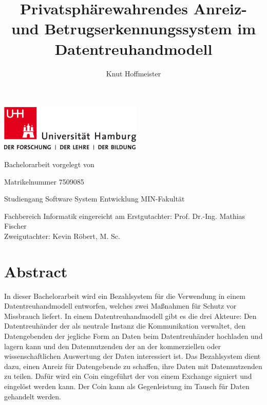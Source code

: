 \documentclass[
	fontsize=11pt,
	headings=small,
	parskip=half,           %
	bibliography=totoc,
	numbers=noenddot,       %
	open=any,               %
]{scrreprt}
\begin{document}
\title{Privatsphärewahrendes Anreiz- und Betrugserkennungssystem im\\ Datentreuhandmodell}
\author{Knut Hoffmeister}

\begin{titlepage}
\includegraphics[width=6.8cm]{up-uhh-logo-u-2010-u-farbe-u-rgb.pdf}
\begin{center}
    \vfill
    \Large Bachelorarbeit
    \vfill
    \makeatletter
    {\Large\textsf{\textbf{\@title}}}
    \makeatother
    \vfill
    vorgelegt von
    \par\bigskip
    \makeatletter
    {\@author}
    \makeatother
    \par
    Matrikelnummer 7509085 \par
    Studiengang Software System Entwicklung
    \vfill
    MIN-Fakultät \par
    Fachbereich Informatik
    \vfill
    \makeatletter
    eingereicht am {\@date}
    \makeatother
    \vfill
    Erstgutachter: Prof. Dr.-Ing. Mathias Fischer\\
    Zweigutachter: Kevin Röbert, M. Sc.
\end{center}
\end{titlepage}

\restoregeometry

\tableofcontents

\chapter*{Abstract}
In dieser Bachelorarbeit wird ein Bezahlsystem für die Verwendung in einem Datentreuhandmodell entworfen, welches zwei Maßnahmen für Schutz vor Missbrauch liefert. In einem Datentreuhandmodell gibt es die drei Akteure: Den Datentreuhänder der als neutrale Instanz die Kommunikation verwaltet, den Datengebenden der jegliche Form an Daten beim Datentreuhänder hochladen und lagern kann und den Datennutzenden der an der kommerziellen oder wissenschaftlichen Auswertung der Daten interessiert ist. Das Bezahlsystem dient dazu, einen Anreiz für Datengebende zu schaffen, ihre Daten mit Datennutzenden zu teilen. Dafür wird ein Coin eingeführt der von einem Exchange signiert und eingelöst werden kann. Der Coin kann als Gegenleistung im Tausch für Daten gehandelt werden.
\end{document}
